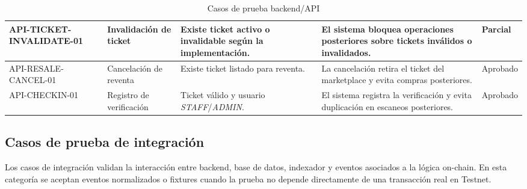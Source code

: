 \documentclass[12pt,letterpaper]{article}
\begin{document}
\begin{table}[H]
\begin{tabularx}{\textwidth}{|
>{\raggedright\arraybackslash}p{2.5cm}|
>{\raggedright\arraybackslash}p{3.2cm}|
>{\raggedright\arraybackslash}X|
>{\raggedright\arraybackslash}p{3.6cm}|
>{\centering\arraybackslash}p{1.5cm}|}
\hline
API-TICKET-INVALIDATE-01 & Invalidación de ticket & Existe ticket activo o invalidable según la implementación. & El sistema bloquea operaciones posteriores sobre tickets inválidos o invalidados. & Parcial \\
\hline
API-RESALE-CANCEL-01 & Cancelación de reventa & Existe ticket listado para reventa. & La cancelación retira el ticket del marketplace y evita compras posteriores. & Aprobado \\
\hline
API-CHECKIN-01 & Registro de verificación & Ticket válido y usuario \textit{STAFF}/\textit{ADMIN}. & El sistema registra la verificación y evita duplicación en escaneos posteriores. & Aprobado \\
\hline
\end{tabularx}

\endgroup
\caption{Casos de prueba backend/API}
\label{tab:casos-prueba-backend-api}
\end{table}

\subsection{Casos de prueba de integración}

Los casos de integración validan la interacción entre backend, base de datos, indexador y eventos asociados a la lógica on-chain. En esta categoría se aceptan eventos normalizados o fixtures cuando la prueba no depende directamente de una transacción real en Testnet.
\end{document}
